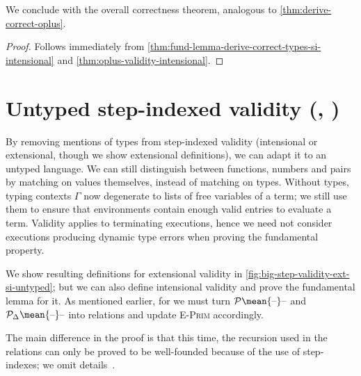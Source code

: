 We conclude with the overall correctness theorem, analogous to
\cref{thm:derive-correct-oplus}.

\deriveCorrectOplusSI
\begin{proof}
  Follows immediately from
  \cref{thm:fund-lemma-derive-correct-types-si-intensional} and
  \cref{thm:oplus-validity-intensional}.
\end{proof}

\section{Untyped step-indexed validity (\ilcUntau{}, \dilcUntau{})}
\label{sec:silr-untyped-proof}
By removing mentions of types from step-indexed validity
(intensional or extensional, though we show extensional definitions), we can
adapt it to an untyped language.
We can still distinguish between functions, numbers and pairs by
matching on values themselves, instead of matching on types.
Without types, typing contexts \ensuremath{\Gamma} now degenerate to lists of
free variables of a term; we still use them to ensure that
environments contain enough valid entries to evaluate a term.
Validity applies to terminating executions, hence we need not
consider executions producing dynamic type errors when proving
the fundamental property.

We show resulting definitions for extensional validity in
\cref{fig:big-step-validity-ext-si-untyped}; but we can also define
intensional validity and prove the fundamental lemma for it.
As mentioned earlier, for \ilcUntau{} we must turn \ensuremath{\mathcal{P}\mean{\text{\textendash}}\text{\textendash}} and \ensuremath{\mathcal{P}_{\Delta}\mean{\text{\textendash}}\text{\textendash}}
into relations and update \textsc{E-Prim} accordingly.

The main difference in the proof is that this time, the recursion
used in the relations can only be proved to be well-founded
because of the use of step-indexes; we omit
details~\citep{Ahmed2006stepindexed}.

